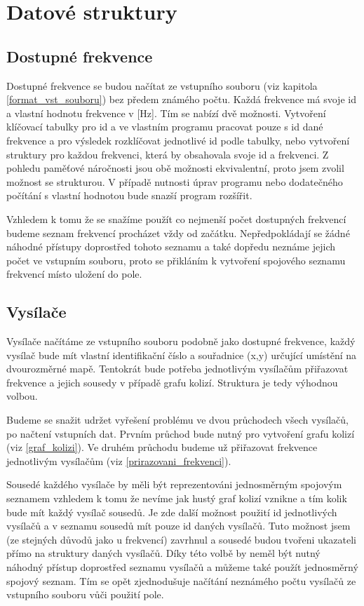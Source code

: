 \documentclass[12pt]{report}
\begin{document}
\section{Datové struktury}
\subsection{Dostupné frekvence}
Dostupné frekvence se budou načítat ze vstupního souboru (viz kapitola \ref{format_vst_souboru}) bez předem známého počtu. Každá frekvence má svoje id a vlastní hodnotu frekvence v [Hz]. Tím se nabízí dvě možnosti. Vytvoření klíčovací tabulky pro id a ve vlastním programu pracovat pouze s id dané frekvence a pro výsledek rozklíčovat jednotlivé id podle tabulky, nebo vytvoření struktury pro každou frekvenci, která by obsahovala svoje id a frekvenci. Z pohledu paměťové náročnosti jsou obě možnosti ekvivalentní, proto jsem zvolil možnost se strukturou. V případě nutnosti úprav programu nebo dodatečného počítání s vlastní hodnotou bude snazší program rozšířit.

Vzhledem k tomu že se snažíme použít co nejmenší počet dostupných frekvencí budeme seznam frekvencí procházet vždy od začátku. Nepředpokládají se žádné náhodné přístupy doprostřed tohoto seznamu a také dopředu neznáme jejich počet ve vstupním souboru, proto se přikláním k vytvoření spojového seznamu frekvencí místo uložení do pole.

\subsection{Vysílače}
Vysílače načítáme ze vstupního souboru podobně jako dostupné frekvence, každý vysílač bude mít vlastní identifikační číslo a souřadnice (x,y) určující umístění na dvourozměrné mapě. Tentokrát bude potřeba jednotlivým vysílačům přiřazovat frekvence a jejich sousedy v případě grafu kolizí. Struktura je tedy výhodnou volbou.

Budeme se snažit udržet vyřešení problému ve dvou průchodech všech vysílačů, po načtení vstupních dat. Prvním průchod bude nutný pro vytvoření grafu kolizí (viz \ref{graf_kolizi}). Ve druhém průchodu budeme už přiřazovat frekvence jednotlivým vysílačům (viz \ref{prirazovani_frekvenci}). 

Sousedé každého vysílače by měli být reprezentováni jednosměrným spojovým seznamem vzhledem k tomu že nevíme jak hustý graf kolizí vznikne a tím kolik bude mít každý vysílač sousedů. Je zde další možnost použití id jednotlivých vysílačů a v seznamu sousedů mít pouze id daných vysílačů. Tuto možnost jsem (ze stejných důvodů jako u frekvencí) zavrhnul a sousedé budou tvořeni ukazateli přímo na struktury daných vysílačů. Díky této volbě by neměl být nutný náhodný přístup doprostřed seznamu vysílačů a můžeme také použít jednosměrný spojový seznam. Tím se opět zjednodušuje načítání neznámého počtu vysílačů ze vstupního souboru vůči použití pole.
\end{document}
